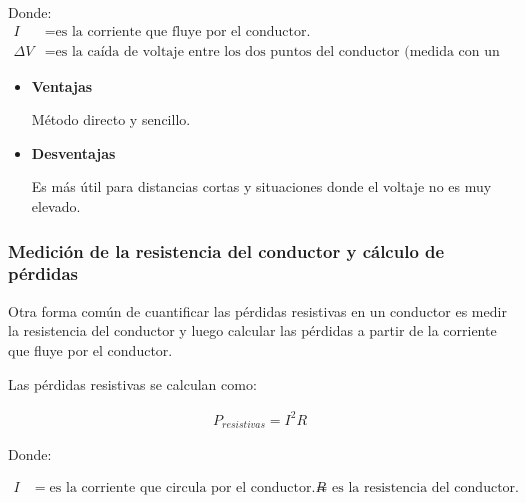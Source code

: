             Donde:
            \begin{align*}
                I &= \text{es la corriente que fluye por el conductor.} \\[0.2cm]
                \Delta V &= \text{es la caída de voltaje entre los dos puntos del conductor (medida con un voltímetro).}
            \end{align*}

            \begin{itemize}
                \item \textbf{Ventajas} 

                    Método directo y sencillo.  

                
                \item \textbf{Desventajas}

                    Es más útil para distancias cortas y situaciones donde el voltaje no es muy elevado.
            \end{itemize}

        \subsubsection{Medición de la resistencia del conductor y cálculo de pérdidas}

            Otra forma común de cuantificar las pérdidas resistivas en un conductor es medir la resistencia del conductor y luego calcular las pérdidas a partir de la corriente que fluye por el conductor.

            Las pérdidas resistivas se calculan como:

            \begin{gather}
                P_{resistivas} = I^2 R \label{eq:pot_resistiva}
            \end{gather}

            Donde:

            \begin{align*}
                I&= \text{es la corriente que circula por el conductor.}
                R & = \text{ es la resistencia del conductor.}
            \end{align*}

